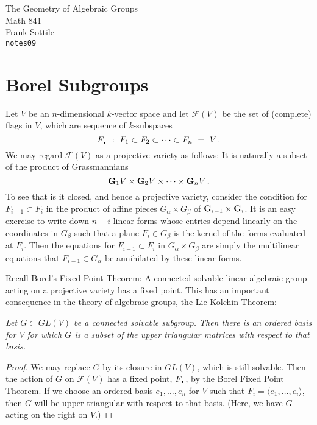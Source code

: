 \documentclass[12pt]{amsart}
\def\silentfootnote#1{{\let\thefootnote\relax\footnotetext{#1}}}
\newcommand{\G}{{\bf G}}
\begin{document}
\begin{center}
\Large
The Geometry of Algebraic Groups\\
\large
Math 841\\
Frank Sottile\\
{\tt notes09}
\end{center}\bigskip

\newcommand{\DOT}{{\mbox{\Large\bf .}}}

\silentfootnote{\sl Version of 25 March 2000} 

\section{Borel Subgroups}


Let $V$ be an $n$-dimensional  $k$-vector space and let ${\mathcal F}(V)$ be
the set of 
(complete) flags in $V$, which are sequence of $k$-subspaces
$$
   F_{\DOT}\ :\ F_1\subset F_2\subset\cdots\subset F_n\ =\ V\,.
$$
We may regard ${\mathcal F}(V)$ as a projective variety as follows:
It is naturally a subset of the product of Grassmannians
$$
  {\bf G}_1V\times {\bf G}_2 V\times \cdots\times {\bf G}_nV\,.
$$
To see that is it closed, and hence a projective variety,
consider the condition for $F_{i-1}\subset F_i$ in
the product of affine pieces $G_{\alpha}\times G_\beta$ of 
$\G_{i-1}\times \G_i$.
It is an easy exercise to write down $n-i$ linear forms whose entries depend
linearly on the coordinates in $G_\beta$ such that a plane $F_i\in G_\beta$
is the kernel of the forms evaluated at $F_i$.
Then the equations for $F_{i-1}\subset F_i$ in $G_{\alpha}\times G_\beta$ 
are simply the multilinear equations that $F_{i-1}\in G_\alpha$
be annihilated by these linear forms.


Recall Borel's Fixed Point Theorem:  A connected solvable linear algebraic
group acting  on a projective variety has a fixed point.
This has an important consequence in the theory of algebraic groups, the 
Lie-Kolchin Theorem:
\medskip

{\it
Let $G\subset GL(V)$ be a connected solvable subgroup.
Then there is an ordered  basis for $V$ for which $G$ is a subset of the
upper triangular matrices with respect to that basis.
}\medskip

\begin{proof}
We may replace $G$ by its closure in $GL(V)$, which is still solvable.
Then the action of $G$ on ${\mathcal F}(V)$ has a fixed point, $F_{\DOT}$,
by the Borel Fixed Point Theorem.
If we choose an ordered basis $e_1,\ldots,e_n$ for $V$ such that 
$F_i=\langle e_1,\ldots,e_i\rangle$, then $G$ will be upper triangular with
respect to that basis.
(Here, we have $G$ acting on the right on $V$.)
\end{proof}
\end{document}
